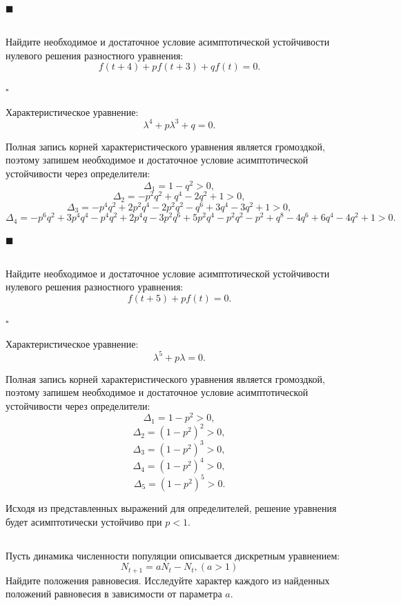 \documentclass[a4paper]{article}
\newcommand{\solutionstart}{{\noindent $\square$ \\}}
\newcommand{\solutionend}{{\noindent $\blacksquare$ \\}}
\begin{document}
\solutionend


\subsection{}
Найдите необходимое и достаточное условие асимптотической устойчивости нулевого решения разностного уравнения:
\[
	f (t + 4) + p f(t + 3) + q f(t) = 0.
\]

\solutionstart

Характеристическое уравнение:
\[
	\lambda^4 + p \lambda^3 + q = 0.
\]

Полная запись корней характеристического уравнения является громоздкой, поэтому запишем необходимое и достаточное условие асимптотической устойчивости через определители:
\[
\Delta_1 = 1 - q^2 > 0,
\]
\[
\Delta_2 = -p^2 q^2 + q^4 - 2 q^2 + 1 > 0,
\]
\[
\Delta_3 = -p^4 q^2 + 2 p^2 q^4 - 2 p^2 q^2 - q^6 + 3 q^4 - 3 q^2 + 1 > 0,
\]
\[
\Delta_4 = -p^6 q^2 + 3 p^4 q^4 - p^4 q^2 + 2 p^4 q - 3 p^2 q^6 + 5 p^2 q^4 - p^2 q^2 - p^2 + q^8 - 4 q^6 + 6 q^4 - 4 q^2 + 1 > 0.
\]

\solutionend


\subsection{}
Найдите необходимое и достаточное условие асимптотической устойчивости нулевого решения разностного уравнения:
\[
	f (t + 5) + p f(t) = 0.
\]

\solutionstart

Характеристическое уравнение:
\[
	\lambda^5 + p \lambda = 0.
\]

Полная запись корней характеристического уравнения является громоздкой, поэтому запишем необходимое и достаточное условие асимптотической устойчивости через определители:
\[
\Delta_1 = 1 - p^2 > 0,
\]
\[
\Delta_2 = (1 - p^2)^2 > 0,
\]
\[
\Delta_3 = (1 - p^2)^3 > 0,
\]
\[
\Delta_4 = (1 - p^2)^4 > 0,
\]
\[
\Delta_5 = (1 - p^2)^5 > 0.
\]

Исходя из представленных выражений для определителей, решение уравнения будет асимптотически устойчиво при $p < 1$.


\subsection{}
Пусть динамика численности популяции описывается дискретным уравнением:
\[
N_{t + 1} = a N_t - N_t, (a > 1)
\]
Найдите положения равновесия. Исследуйте характер каждого из найденных положений равновесия в зависимости от параметра $a$.
\end{document}
